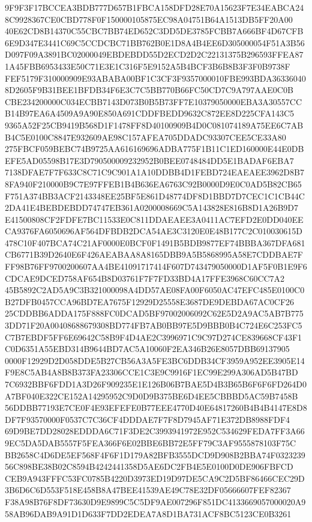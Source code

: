 \documentclass[UTF8,fontset=fandol,zihao=-4,a4paper]{ctexart}
\begin{document}
{{9F9F3F17BCCEA3BDB777D657B1FBCA158DFD28E70A15623F7E34EABCA248C9928367CE0CBD778F0F150000105875EC98A04751B64A1513DB5FF20A00
40E62CD8B14370C55CBC7BB74ED652C3DD5DE3785FCBB7A666BF4D67CFB6E9D347E3441C69C5CCDCBC71BB762B0E1D8A4B4EE6D305000054F51A3B56
D097F09A3891BC02000049EBDEBDD55D2ECD2D2C22131375B296593FFEA871A45FBB6953433E50C71E3E1C316F5E9152A5B4BCF3B6B8B3F3F0B9738F
FEF5179F310000909E93ABABA00BF1C3CF3F9357000010FBE993BDA363360408D2605F9B31BEE1BFDB34F6E3C7C5BB770B66FC50CD7C9A797AAE0C0B
CBE234200000C034ECBB7143D073B0B5B73FF7E10379050000EBA3A30557CCB14B97EA6A4509A9A90E850A691CDDFBEDD9632C872EE8D225CFA143C5
9365A52F25CB9419B568D1F1478FF8D40100909B4D0C081074189A75EE6C7ABB4C5E0100C8847E932609AE98C157AFEA705DDADC93307CEE5CE33A80
275FBCF059BEBC74B9725AA616169696ADBA775F1B11C1ED160000E44E0DBEFE5AD05598B17E3D790500009232952B0BEE0748484DD5E1BADAF6EBA7
7138DFAE7F7F633C8C71C9C901A1A10DDBB4D1FEBD724EAEAEE3962D8B78FA940F210000B9C7E97FFEB1B4B636EA6763C92B0000D9E0C0AD5B82CB65
F751A374BB3ACF2143348EE25BF5E861D48774DF8D1BBD7D7CEC1C1CB44C2DA41E4BEBDEBDD74747EB361A0200008669C5A143828E816B8D1A26B9D7
E41500808CF2FDFE7BC11533E0C811DDAEAEE3A0411AC7EFD2E0DD040EECA9376FA6050696AF564DFBDB2DCA54AE3C3120E0E48B177C2C010030615D
478C10F407BCA74C21AF0000E0BCF0F1491B5BDB9877EF74BBBA367DFA681CB6771B39D2640E6F426AEABAA8A8165DBB9A5B5868995A58E7CDDBAE7F
FF98B76FF9700200607AA4BE41091717414F607D743479050000D1AF5F0B1E9F6CDCAE9DCED758AF654B8D03761F7F7FD33BD4A17FFE3968C60CC7A2
45B5892C2AD5A9C3B321000098A4DD57AE08FA00F6050AC47EFC485E0100C0B27DFB0457CCA96BD7EA7675F12929D25558E3687DE9DEBDA67AC0CF26
25CDDBB6ADDA175F888FC0DCAD5BF97002006092C62E5D2A9AC5AB7B7753DD71F20A00408688679308BD774FB7AB0BB97E5D9BBB0B4C724E6C253FC5
C7B7EBDF5FF6E69642C58B9F4D4AE2C3996971C9C97D274CE839668CF43F1C0D6351A55EBD314B9644BD7AC5A10060F2EA346B26E8057DBB69137905
0000F12929D2D058DDE5B27CB56A3A5FE3BC6DDB34CF3959A952EE3905E14F9E8C5AB4A8B8B373FA23306CCE1C3E9C9916F1EC99E299A306AD5B47BD
7C6932BBF6FDD1A3D26F909235E1E126B06B7BAE5D4B3B65B6F6F6FD264D0A7BF040E322CE152A14295952C9D0D9B375BE6D4EE5CBBBD5AC59B7458B
56DDBB77193E7CE0F4E93EFEFE0B77EEE4770D40E64817260B4B4B4147E8D8DF7F93570000F0537C7C36CF4DDDAE7F7F8D7945AF71E372DB8988FDF4
69D9BE7DD28028EDDDA6C71F3DE2C3993941972E952C534629FEDA7FF3A669EC5DA5DAB5557F5FEA366F6E02BBE6BB72E5FF79C3AF9555878103F75C
BB2658C4D6DE5EF568F4F6F1D179A82BFB3555DCD9D908B2BBA74F032323956C898BE38B02C8594B4242441358D5AE6DC2FB4E5E0100D0DE906FBFCD
CEB9A943FFFC53FC0785B4220D3973ED19D97DE5CA9C2D5BF86466CEC29D3B6D6C6D553F518E458B8A47BEE41539AE49C78E32DF05666607FEF82367
F38A98B76F8DF73630D9E9899C5C5DF9AE007296F851DC4133669057000020A958AB96DAB9A91D1D633F7DD2EDEA7A8D1BA731ACF8BC5123CE0B3261
}}
\end{document}
